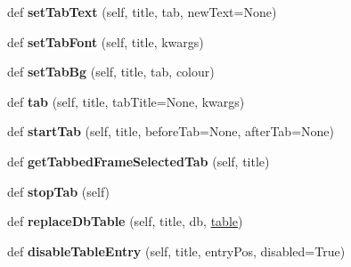 \begin{DoxyCompactItemize}
\item 
\mbox{\label{class_python_01_g_u_i_1_1appjar_1_1gui_a18e2f8bad44e720bf31dcc0d3870e623}} 
def {\bfseries set\+Tab\+Text} (self, title, tab, new\+Text=None)
\item 
\mbox{\label{class_python_01_g_u_i_1_1appjar_1_1gui_a98057f6d4fa7532aca71751b00e03785}} 
def {\bfseries set\+Tab\+Font} (self, title, kwargs)
\item 
\mbox{\label{class_python_01_g_u_i_1_1appjar_1_1gui_a8a730cadb45a97339dee5d8f4d2d250a}} 
def {\bfseries set\+Tab\+Bg} (self, title, tab, colour)
\item 
\mbox{\label{class_python_01_g_u_i_1_1appjar_1_1gui_a13289a5bccc21b335784580191e3fb80}} 
def {\bfseries tab} (self, title, tab\+Title=None, kwargs)
\item 
\mbox{\label{class_python_01_g_u_i_1_1appjar_1_1gui_a647e602b8e4a1f0643541d12227fc947}} 
def {\bfseries start\+Tab} (self, title, before\+Tab=None, after\+Tab=None)
\item 
\mbox{\label{class_python_01_g_u_i_1_1appjar_1_1gui_a88eef51d71a5e4fb58bf4c9c85f72397}} 
def {\bfseries get\+Tabbed\+Frame\+Selected\+Tab} (self, title)
\item 
\mbox{\label{class_python_01_g_u_i_1_1appjar_1_1gui_abb86e9a927f8752946b1ed4965205c3d}} 
def {\bfseries stop\+Tab} (self)
\item 
\mbox{\label{class_python_01_g_u_i_1_1appjar_1_1gui_a4ee55b4d487a45cd562fcec7882dd410}} 
def {\bfseries replace\+Db\+Table} (self, title, db, \hyperlink{class_python_01_g_u_i_1_1appjar_1_1gui_a53e86304a35d41e135f8449ad83a3640}{table})
\item 
\mbox{\label{class_python_01_g_u_i_1_1appjar_1_1gui_a0c42c43e4535c6311f93e7e4253b90e7}} 
def {\bfseries disable\+Table\+Entry} (self, title, entry\+Pos, disabled=True)

\end{DoxyCompactItemize}
